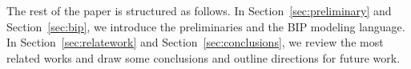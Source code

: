 

The rest of the paper is structured as follows.
%
In Section~\ref{sec:preliminary} and Section~\ref{sec:bip}, we introduce the preliminaries and the BIP modeling language.
%
In Section~\ref{sec:relatework} and Section~\ref{sec:conclusions}, we review the most related works and draw some conclusions and outline directions for future work.

